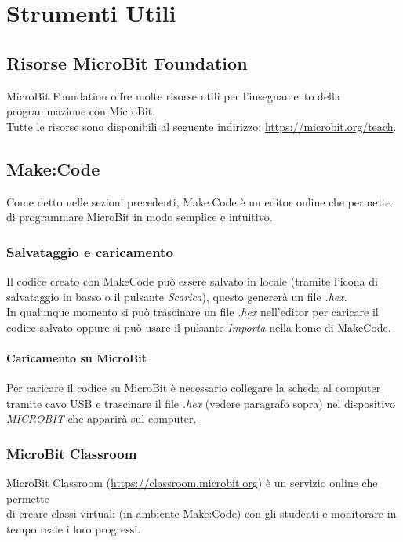 \documentclass[../../docenti.tex]{subfiles}
\begin{document}
\section{Strumenti Utili}

\subsection{Risorse MicroBit Foundation}
MicroBit Foundation offre molte risorse utili per l'insegnamento della programmazione con MicroBit.\\
Tutte le risorse sono disponibili al seguente indirizzo: \url{https://microbit.org/teach}.

\subsection{Make:Code}
Come detto nelle sezioni precedenti, Make:Code è un editor online che permette di programmare MicroBit in modo semplice e intuitivo.

\subsubsection{Salvataggio e caricamento}
\label{sec:makecode_save_load}
Il codice creato con MakeCode può essere salvato in locale (tramite l'icona di salvataggio in basso o il pulsante \textit{Scarica}), questo genererà un file \textit{.hex}.\\
In qualunque momento si può trascinare un file \textit{.hex} nell'editor per caricare il codice salvato oppure si può usare il pulsante \textit{Importa} nella home di MakeCode.

\paragraph{Caricamento su MicroBit}
Per caricare il codice su MicroBit è necessario collegare la scheda al computer tramite cavo USB e trascinare il file \textit{.hex} (vedere paragrafo sopra) nel dispositivo \textit{MICROBIT} che apparirà sul computer.

\subsubsection{MicroBit Classroom}
MicroBit Classroom (\url{https://classroom.microbit.org}) è un servizio online che permette\\ di creare classi virtuali (in ambiente Make:Code) con gli studenti e monitorare in tempo reale i loro progressi.
\end{document}
